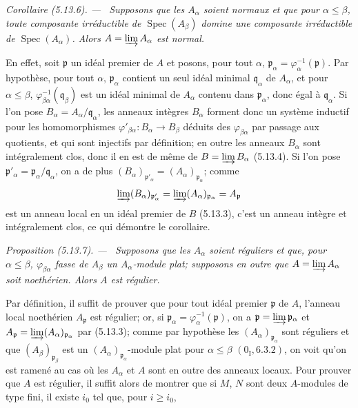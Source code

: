 \documentclass[10pt,oneside]{book}
\newenvironment{proposition}[1][]{%
  \par\medskip\noindent\itshape Proposition (#1). ---\ }{\par}
\newenvironment{corollary}[1][]{%
  \par\medskip\noindent\itshape Corollaire (#1). ---\ }{\par}
\begin{document}
\begin{corollary}[5.13.6]
\label{IV.2.s5.13.6-fr}
Supposons que les $A_\alpha$ soient normaux et que pour $\alpha\leq\beta$,
toute composante irréductible de $\operatorname{Spec}(A_\beta)$ domine une
composante irréductible de $\operatorname{Spec}(A_\alpha)$. Alors
$A=\varinjlim A_\alpha$ est normal.
\end{corollary}

En effet, soit $\mathfrak p$ un idéal premier de $A$ et posons, pour tout
$\alpha$, $\mathfrak p_\alpha=\varphi_\alpha^{-1}(\mathfrak p)$. Par
hypothèse, pour tout $\alpha$, $\mathfrak p_\alpha$ contient un seul idéal
minimal $\mathfrak q_\alpha$ de $A_\alpha$, et pour $\alpha\leq\beta$,
$\varphi_{\beta\alpha}^{-1}(\mathfrak q_\beta)$ est un idéal minimal de
$A_\alpha$ contenu dans $\mathfrak p_\alpha$, donc égal à
$\mathfrak q_\alpha$. Si l'on pose
$B_\alpha=A_\alpha/\mathfrak q_\alpha$, les anneaux intègres $B_\alpha$
forment donc un système inductif pour les homomorphismes
$\varphi'_{\beta\alpha}:B_\alpha\to B_\beta$ déduits des
$\varphi_{\beta\alpha}$ par passage aux quotients, et qui sont injectifs par
définition; en outre les anneaux $B_\alpha$ sont intégralement clos, donc il en
est de même de $B=\varinjlim B_\alpha$ (5.13.4). Si l'on pose
$\mathfrak p'_\alpha=\mathfrak p_\alpha/\mathfrak q_\alpha$, on a de plus
$(B_\alpha)_{\mathfrak p'_\alpha}=(A_\alpha)_{\mathfrak p_\alpha}$; comme
\[
\varinjlim(B_\alpha)_{\mathfrak p'_\alpha}
=\varinjlim(A_\alpha)_{\mathfrak p_\alpha}=A_{\mathfrak p}
\]
est un anneau local en un idéal premier de $B$ (5.13.3), c'est un anneau
intègre et intégralement clos, ce qui démontre le corollaire.

\begin{proposition}[5.13.7]
\label{IV.2.s5.13.7-fr}
Supposons que les $A_\alpha$ soient réguliers et que, pour
$\alpha\leq\beta$, $\varphi_{\beta\alpha}$ fasse de $A_\beta$ un
$A_\alpha$-module plat; supposons en outre que
$A=\varinjlim A_\alpha$ soit noethérien. Alors $A$ est régulier.
\end{proposition}

Par définition, il suffit de prouver que pour tout idéal premier $\mathfrak p$
de $A$, l'anneau local noethérien $A_{\mathfrak p}$ est régulier; or, si
$\mathfrak p_\alpha=\varphi_\alpha^{-1}(\mathfrak p)$, on a
$\mathfrak p=\varinjlim\mathfrak p_\alpha$ et
$A_{\mathfrak p}=\varinjlim(A_\alpha)_{\mathfrak p_\alpha}$ par (5.13.3);
comme par hypothèse les $(A_\alpha)_{\mathfrak p_\alpha}$ sont réguliers et
que $(A_\beta)_{\mathfrak p_\beta}$ est un
$(A_\alpha)_{\mathfrak p_\alpha}$-module plat pour $\alpha\leq\beta$
$(0_{\mathrm I}, 6.3.2)$, on voit qu'on est ramené au cas où les $A_\alpha$ et
$A$ sont en outre des anneaux locaux. Pour prouver que $A$ est régulier, il
suffit alors de montrer que si $M$, $N$ sont deux $A$-modules de type fini, il
existe $i_0$ tel que, pour $i\geq i_0$,
\end{document}
